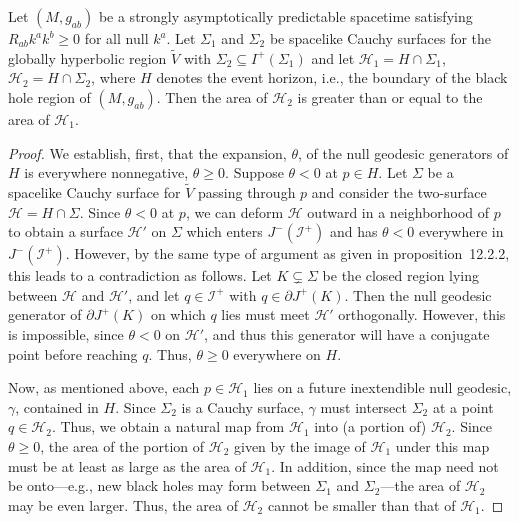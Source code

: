 \begin{theorem}\label{thm:12.2.6}
Let \((M,g_{ab})\) be a strongly asymptotically predictable spacetime satisfying
\(R_{ab}k^ak^b\ge0\) for all null \(k^a\). Let \(\Sigma_1\) and \(\Sigma_2\) be
spacelike Cauchy surfaces for the globally hyperbolic region \(\widetilde V\) with
\(\Sigma_2\subseteq I^+(\Sigma_1)\) and let
\(\mathcal H_1=H\cap\Sigma_1\), \(\mathcal H_2=H\cap\Sigma_2\), where \(H\)
denotes the event horizon, i.e., the boundary of the black hole region of
\((M,g_{ab})\). Then the area of \(\mathcal H_2\) is greater than or equal to the
area of \(\mathcal H_1\).
\end{theorem}
\begin{proof}
We establish, first, that the expansion, \(\theta\), of the null geodesic generators of
\(H\) is everywhere nonnegative, \(\theta\ge0\). Suppose \(\theta<0\) at
\(p\in H\). Let \(\Sigma\) be a spacelike Cauchy surface for \(\widetilde V\) passing
through \(p\) and consider the two-surface \(\mathcal H=H\cap\Sigma\). Since
\(\theta<0\) at \(p\), we can deform \(\mathcal H\) outward in a neighborhood of
\(p\) to obtain a surface \(\mathcal H'\) on \(\Sigma\) which enters
\(J^-(\mathcal I^+)\) and has \(\theta<0\) everywhere in
\(J^-(\mathcal I^+)\). However, by the same type of argument as given in
proposition~12.2.2, this leads to a contradiction as follows. Let
\(K\subsetneq\Sigma\) be the closed region lying between \(\mathcal H\) and
\(\mathcal H'\), and let \(q\in\mathcal I^+\) with
\(q\in\partial J^+(K)\). Then the null geodesic generator of
\(\partial J^+(K)\) on which \(q\) lies must meet \(\mathcal H'\) orthogonally.
However, this is impossible, since \(\theta<0\) on \(\mathcal H'\), and thus this
generator will have a conjugate point before reaching \(q\). Thus, \(\theta\ge0\)
everywhere on \(H\).

Now, as mentioned above, each \(p\in\mathcal H_1\) lies on a future inextendible
null geodesic, \(\gamma\), contained in \(H\). Since \(\Sigma_2\) is a Cauchy
surface, \(\gamma\) must intersect \(\Sigma_2\) at a point \(q\in\mathcal H_2\).
Thus, we obtain a natural map from \(\mathcal H_1\) into (a portion of)
\(\mathcal H_2\). Since \(\theta\ge0\), the area of the portion of \(\mathcal H_2\)
given by the image of \(\mathcal H_1\) under this map must be at least as large as
the area of \(\mathcal H_1\). In addition, since the map need not be onto---e.g., new
black holes may form between \(\Sigma_1\) and \(\Sigma_2\)---the area of
\(\mathcal H_2\) may be even larger. Thus, the area of \(\mathcal H_2\) cannot be
smaller than that of \(\mathcal H_1\).
\end{proof}
